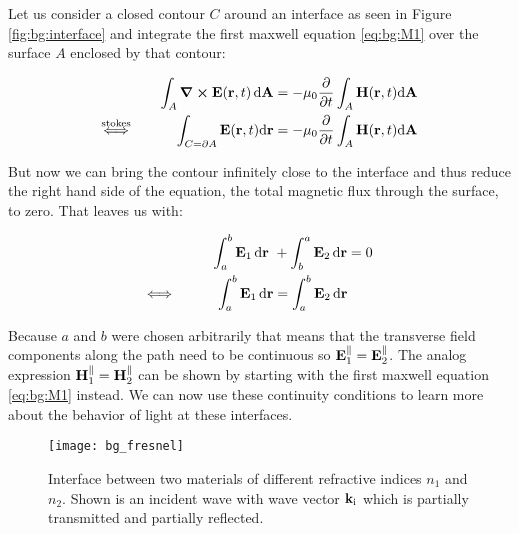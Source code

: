 Let us consider a closed contour $C$ around an interface as seen in Figure \ref{fig:bg:interface} and integrate the first maxwell equation \eqref{eq:bg:M1} over the surface $A$ enclosed by that contour:

\begin{equation}
\begin{aligned}
    \int_A \curl \vb E(\vb r, t) \, \dd \vb A
    &= - \mu_0 \pdv t \int_A \vb H(\vb r, t) \dd \vb A\\
    \overset{\mathrm{stokes}}{\Longleftrightarrow} \hspace{3em}
    \int_{C = \partial A} \vb E(\vb r, t) \dd \vb r
    &= - \mu_0 \pdv t \int_A \vb H(\vb r, t) \dd \vb A\\
\end{aligned}
\end{equation}

But now we can bring the contour infinitely close to the interface and thus reduce the right hand side of the equation, the total magnetic flux through the surface, to zero. That leaves us with:

\begin{equation}
\begin{aligned}
    \int_a^b \vb E_1 \, \dd \vb r \ &+ \int_b^a \vb E_2 \,  \dd \vb r = 0\\
    \Longleftrightarrow \hspace{3em}
    \int_a^b \vb E_1 \, \dd \vb r &= \int_a^b \vb E_2 \,  \dd \vb r \\
\end{aligned}
\end{equation}

Because $a$ and $b$ were chosen arbitrarily that means that the transverse field components along the path need to be continuous so
$\vb E_1^{\parallel} = \vb E_2^{\parallel}$.
The analog expression
$\vb H_1^{\parallel} = \vb H_2^{\parallel}$
can be shown by starting with the first maxwell equation \eqref{eq:bg:M1} instead. We can now use these continuity conditions to learn more about the behavior of light at these interfaces.

\begin{figure}[H]
    \centering
    \texttt{[image: bg\_fresnel]}
    \caption{Interface between two materials of different refractive indices $n_1$ and $n_2$. Shown is an incident wave with wave vector $\vb k_{\mathrm{i}}$ which is partially transmitted and partially reflected.}
    \label{fig:bg:fresnel}
\end{figure}

